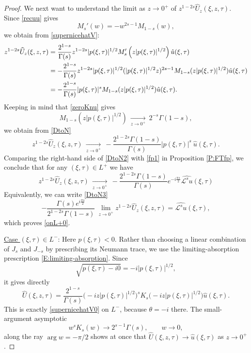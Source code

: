 \documentclass[11pt,letter]{amsart}
\def \G{\Gamma}
\numberwithin{equation}{section}
\newcommand{\Le}{\mathcal L}
\numberwithin{equation}{section}
\begin{document}
\begin{proof}
We next want to understand the limit as $z\to 0^+$ of $z^{1-2s} \widehat U_z(\xi,z,\tau)$. 
Since \eqref{recuu} gives
\begin{equation*}
M_s'(w) = - w^{2s-1} M_{1-s}(w),
\end{equation*}
we obtain from \eqref{supernicehatV}:
\begin{align}\label{DtoN}
z^{1-2s} \widehat U_z(\xi,z,\tau) & = \frac{2^{1-s}}{ \G(s)}z^{1-2s} |p(\xi,\tau)|^{1/2}  M'_{s}\left(z |p(\xi,\tau)|^{1/2}\right) \hat u(\xi,\tau)
\\
& = -  \frac{2^{1-s} }{ \G(s)} z^{1-2s}  |p(\xi,\tau)|^{1/2} (|p(\xi,\tau)|^{1/2}z)^{2s-1} M_{1-s}(z |p(\xi,\tau)|^{1/2})\hat u(\xi,\tau)
\notag\\
& = -  \frac{2^{1-s}}{ \G(s)} |p(\xi,\tau)|^{s}  M_{1-s}(z |p(\xi,\tau)|^{1/2})\hat u(\xi,\tau).
\notag
\end{align}
Keeping in mind that \eqref{zeroKnu} gives
\[
M_{1-s}(z |p(\xi,\tau)|^{1/2})\ \underset{z\to 0^+}{\longrightarrow}\ 2^{-s}\G(1-s),
\]
we obtain from \eqref{DtoN}
\begin{equation}\label{DtoN2}
z^{1-2s} \widehat U_z(\xi,z,\tau)\ \underset{z\to 0^+}{\longrightarrow}\ -  \frac{2^{1-2s}\G(1-s)}{ \G(s)} |p(\xi,\tau)|^{s}\ \hat u(\xi,\tau).
\end{equation}
Comparing the right-hand side of \eqref{DtoN2} with \eqref{fp1} in Proposition \ref{P:FTfp}, we conclude that for any $(\xi,\tau)\in L^+$ we have
\begin{equation}\label{DtoN3}
z^{1-2s} \widehat U_z(\xi,z,\tau)\ \underset{z\to 0^+}{\longrightarrow}\ -  \frac{2^{1-2s}\G(1-s)}{ \G(s)} e^{-i\frac{\pi s}2} \widehat{\Le^s u}(\xi,\tau)
\end{equation}
Equivalently, we can write \eqref{DtoN3}
\begin{equation}\label{onL+}
- \frac{ \G(s)e^{i\frac{\pi s}2} }{2^{1-2s}\G(1-s)}\ \underset{z\to 0^+}{\lim} z^{1-2s} \widehat U_z(\xi,z,\tau) = \widehat{\Le^s u}(\xi,\tau), 
\end{equation}
which proves \eqref{onL+0}.

\vskip 0.2in

\noindent \underline{Case $(\xi,\tau)\in L^-$}: Here $p(\xi,\tau)<0$. Rather than
choosing a linear combination of $J_s$ and $J_{-s}$ by prescribing its Neumann
trace, we use the limiting-absorption prescription \eqref{E:limiting-absorption}.
Since
\[
\sqrt{p(\xi,\tau)-i0}=-i|p(\xi,\tau)|^{1/2},
\]
it gives directly
\begin{equation}\label{oplada}
\widehat U(\xi,z,\tau)
=
\frac{2^{1-s}}{\G(s)}
\bigl(-iz|p(\xi,\tau)|^{1/2}\bigr)^s
K_s\bigl(-iz|p(\xi,\tau)|^{1/2}\bigr)
\widehat u(\xi,\tau).
\end{equation}
This is exactly \eqref{supernicehatV0} on $L^-$, because $\theta=-i$ there.
The small-argument asymptotic
\[
w^sK_s(w)\longrightarrow 2^{s-1}\G(s),
\qquad w\to0,
\]
along the ray $\arg w=-\pi/2$ shows at once that
$\widehat U(\xi,z,\tau)\to\widehat u(\xi,\tau)$ as $z\to0^+$.


\end{proof}
\end{document}

